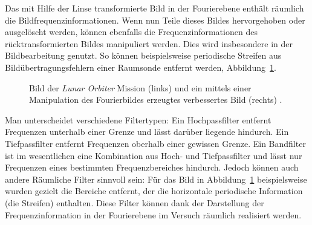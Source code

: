 
Das mit Hilfe der Linse transformierte Bild in der Fourierebene enthält räumlich die Bildfrequenzinformationen. Wenn nun Teile dieses Bildes hervorgehoben oder ausgelöscht werden, können ebenfalls die Frequenzinformationen des rücktransformierten Bildes manipuliert werden. Dies wird insbesondere in der Bildbearbeitung genutzt. So können beispielsweise periodische Streifen aus Bildübertragungsfehlern einer Raumsonde entfernt werden, Abbildung~\ref{fig:Plato_LO_big}.

\begin{figure}[h]
	\centering
	\caption[Beispiel der FT in der Bildbearbeitung]{Bild der \textit{Lunar Orbiter} Mission (links) und ein mittels einer Manipulation des Fourierbildes erzeugtes verbessertes Bild (rechts) \cite{_highlight_????}.}
	\label{fig:Plato_LO_big}
\end{figure}

Man unterscheidet verschiedene Filtertypen: Ein Hochpassfilter entfernt Frequenzen unterhalb einer Grenze und lässt darüber liegende hindurch. Ein Tiefpassfilter entfernt Frequenzen oberhalb einer gewissen Grenze. Ein Bandfilter ist im wesentlichen eine Kombination aus Hoch- und Tiefpassfilter und lässt nur Frequenzen eines bestimmten Frequenzbereiches hindurch. Jedoch können auch andere Räumliche Filter sinnvoll sein: Für das Bild in Abbildung~\ref{fig:Plato_LO_big} beispielsweise wurden gezielt die Bereiche entfernt, der die horizontale periodische Information (die Streifen) enthalten. Diese Filter können dank der Darstellung der Frequenzinformation in der Fourierebene im Versuch räumlich realisiert werden.